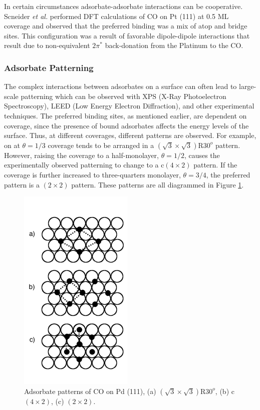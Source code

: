 In certain circumstances adsorbate-adsorbate interactions can be cooperative.
Scneider {\em et al.} performed DFT calculations of CO on Pt (111) at 0.5 ML
coverage and observed that the preferred binding was a mix of atop and bridge
sites.\citep{Deshlahra:2012aa} This configuration was a result of favorable
dipole-dipole interactions that result due to non-equivalent $2\pi^*$
back-donation from the Platinum to the CO.


\subsubsection{Adsorbate Patterning}
The complex interactions between adsorbates on a surface can often lead to
large-scale patterning which can be observed with XPS (X-Ray Photoelectron
Spectroscopy), LEED (Low Energy Electron Diffraction), and other experimental
techniques. The preferred binding sites, as mentioned earlier, are dependent on
coverage, since the presence of bound adsorbates affects the energy levels of
the surface. Thus, at different coverages, different patterns are observed. For
example,  on  at $\theta = 1/3$ coverage tends to be
arranged in a $(\sqrt{3}\times\sqrt{3})\textrm{R}30^o$ pattern. However, raising the coverage to a
half-monolayer, $\theta = 1/2$, causes the experimentally observed patterning to change to a c$(4\times2)$
pattern. If the coverage is further increased to three-quarters monolayer, $\theta = 3/4$, 
the preferred pattern is a $(2\times2)$ pattern.\citep{Guo:1989aa} These patterns are
all diagrammed in Figure \ref{fig:patterns}.

\begin{figure}[p!]
\centering
  \includegraphics[width=0.5\linewidth]{../figures/chap1/pattern.pdf}
  \caption{Adsorbate patterns of CO on Pd (111), (a)
$(\sqrt{3}\times\sqrt{3})\textrm{R}30^o$, (b) c$(4\times2)$, (c) $(2\times2)$.}
\label{fig:patterns}
\end{figure}

